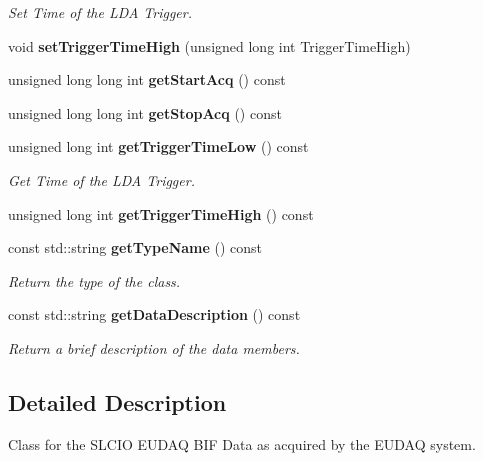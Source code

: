 \begin{DoxyCompactItemize}
\begin{DoxyCompactList}\small\item\em Set Time of the L\-D\-A Trigger. \end{DoxyCompactList}\item 
void {\bfseries set\-Trigger\-Time\-High} (unsigned long int Trigger\-Time\-High)\label{classCALICE_1_1LDABlock_aa050d4415f0b306dff6fba5ae6217654}

\item 
unsigned long long int {\bfseries get\-Start\-Acq} () const \label{classCALICE_1_1LDABlock_afe2c965b42ed1a3d07ac5a5c373c9aff}

\item 
unsigned long long int {\bfseries get\-Stop\-Acq} () const \label{classCALICE_1_1LDABlock_a1aec54f5a7fd69296291eeb8a53b4685}

\item 
unsigned long int {\bf get\-Trigger\-Time\-Low} () const \label{classCALICE_1_1LDABlock_a52f34a278f3b9d28555213a401e93a27}

\begin{DoxyCompactList}\small\item\em Get Time of the L\-D\-A Trigger. \end{DoxyCompactList}\item 
unsigned long int {\bfseries get\-Trigger\-Time\-High} () const \label{classCALICE_1_1LDABlock_a11f4e660c66bf364823b5759698619a9}

\item 
const std\-::string {\bf get\-Type\-Name} () const \label{classCALICE_1_1LDABlock_a6d66f30a375e65f742af053a0e21d244}

\begin{DoxyCompactList}\small\item\em Return the type of the class. \end{DoxyCompactList}\item 
const std\-::string {\bf get\-Data\-Description} () const \label{classCALICE_1_1LDABlock_a579cbbe48f3d7b65f995461df745990e}

\begin{DoxyCompactList}\small\item\em Return a brief description of the data members. \end{DoxyCompactList}\end{DoxyCompactItemize}


\subsection{Detailed Description}
Class for the S\-L\-C\-I\-O E\-U\-D\-A\-Q B\-I\-F Data as acquired by the E\-U\-D\-A\-Q system. 

